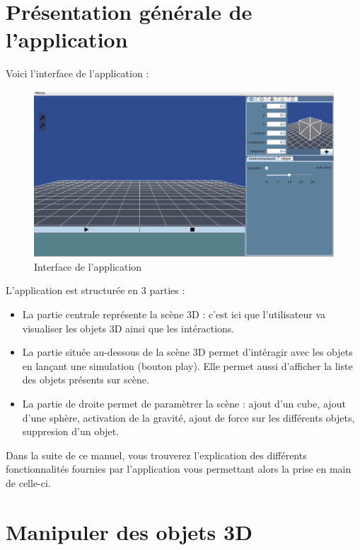 \documentclass[11pt]{report}
\begin{document}
\chapter{Présentation générale de l'application}

Voici l'interface de l'application :

\begin{figure}[h]
  \centering
  \includegraphics[scale=0.4]{./interface.png}
  \caption{Interface de l'application}
\end{figure}

L'application est structurée en 3 parties :
\begin{itemize}
  \item La partie centrale représente la scène 3D : c'est ici que l'utilisateur va visualiser
  les objets 3D ainsi que les intéractions.
  \item La partie située au-dessous de la scène 3D permet d'intéragir avec les objets en
  lançant une simulation (bouton play). Elle permet aussi d'afficher la liste des objets présents
  sur scène.
  \item La partie de droite permet de paramètrer la scène : ajout d'un cube, ajout d'une sphère,
  activation de la gravité, ajout de force sur les différents objets, suppresion d'un objet.\newline
\end{itemize}


Dans la suite de ce manuel, vous trouverez l'explication des différents fonctionnalités fournies
par l'application vous permettant alors la prise en main de celle-ci.


\chapter{Manipuler des objets 3D}
\end{document}
